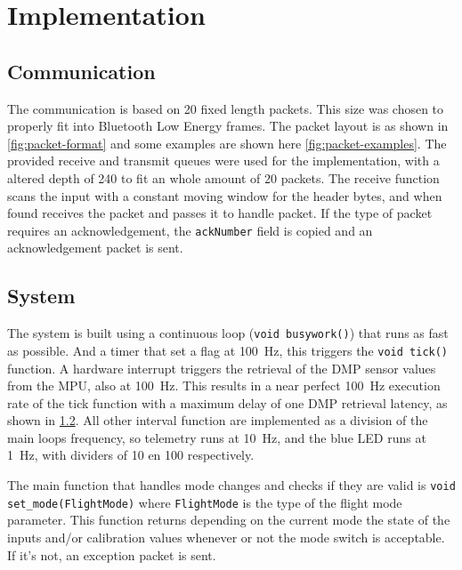\documentclass[final]{article}
\begin{document}
\section{Implementation}
\label{sec:implmentation}



\subsection{Communication}
The communication is based on \SI{20}{\byte} fixed length packets.
This size was chosen to properly fit into Bluetooth Low Energy frames.
The packet layout is as shown in \cref{fig:packet-format} and some examples are shown here \cref{fig:packet-examples}. %
The provided receive and transmit queues were used for the implementation, with a altered depth of \num{240} to fit an whole amount of \SI{20}{\byte} packets.
The receive function scans the input with a constant moving window for the header bytes, and when found receives the packet and passes it to handle packet.
If the type of packet requires an acknowledgement, the \texttt{ackNumber} field is copied and an acknowledgement packet is sent.


\subsection{System}
The system is built using a continuous loop (\texttt{void busywork()}) that runs as fast as possible.
And a timer that set a flag at \SI{100}{\hertz}, this triggers the \texttt{void tick()} function.
A hardware interrupt triggers the retrieval of the DMP sensor values from the MPU, also at \SI{100}{\hertz}.
This results in a near perfect \SI{100}{\hertz} execution rate of the tick function with a maximum delay of one DMP retrieval latency, as shown in \cref{}. %
All other interval function are implemented as a division of the main loops frequency, so telemetry runs at \SI{10}{\hertz}, and the blue LED runs at \SI{1}{\hertz}, with dividers of 10 en 100 respectively.

The main function that handles mode changes and checks if they are valid is \texttt{void set\_mode(FlightMode)} where \texttt{FlightMode} is the type of the flight mode parameter.
This function returns depending on the current mode the state of the inputs and/or calibration values whenever or not the mode switch is acceptable.
If it's not, an exception packet is sent.
\end{document}
